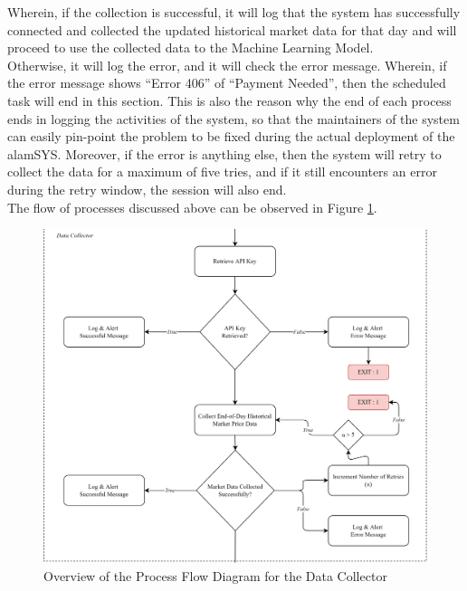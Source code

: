 Wherein, if the collection is successful, it will log that 
the system has successfully connected and collected the updated 
historical market data for that day and will proceed to use the 
collected data to the Machine Learning Model.
\hfill \\

Otherwise, it will log the error, and it will check the error message. 
Wherein, if the error message shows “Error 406” of “Payment Needed”, 
then the scheduled task will end in this section. This is also the reason why 
the end of each process ends in logging the activities of the system, so that 
the maintainers of the system can easily pin-point the problem to be fixed during 
the actual deployment of the alamSYS. Moreover, if the error is anything else, 
then the system will retry to collect the data for a maximum of five tries, and 
if it still encounters an error during the retry window, the session will also end.
\hfill \\

The flow of processes discussed above can be observed in Figure \ref{fig:process_flowchart_data_collector}.

\begin{figure}[ht]
    \centering
    \includegraphics[width=1\textwidth]{./assets/Chapter_3/PFC/ProcessFlowchart_DataCollector.png}
    \caption{Overview of the Process Flow Diagram for the Data Collector}
    \label{fig:process_flowchart_data_collector}
\end{figure}
\FloatBarrier

